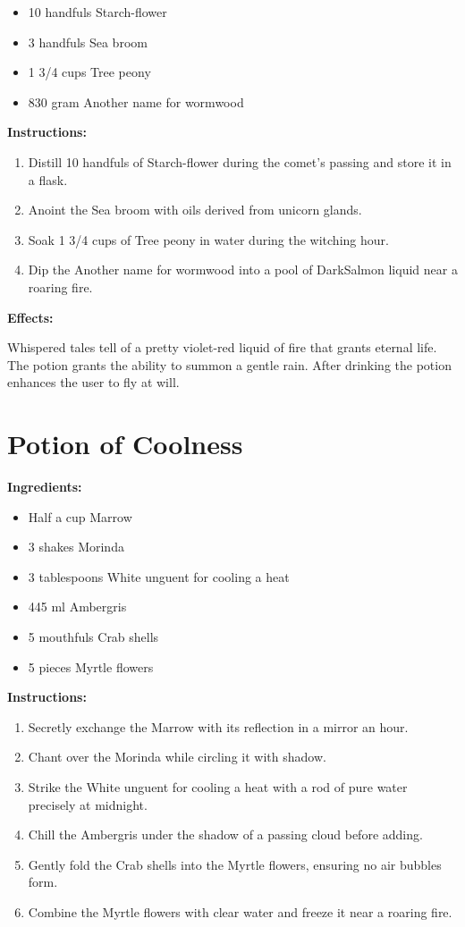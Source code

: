 \documentclass{article}
\begin{document}
\begin{itemize}
  \item 10 handfuls Starch-flower
  \item 3 handfuls Sea broom
  \item 1 3/4 cups Tree peony
  \item 830 gram Another name for wormwood
\end{itemize}

\textbf{Instructions:}

\begin{enumerate}
  \item Distill 10 handfuls of Starch-flower during the comet’s passing and store it in a flask.
  \item Anoint the Sea broom with oils derived from unicorn glands.
  \item Soak 1 3/4 cups of Tree peony in water during the witching hour.
  \item Dip the Another name for wormwood into a pool of DarkSalmon liquid near a roaring fire.
\end{enumerate}

\textbf{Effects:}

Whispered tales tell of a pretty violet-red liquid of fire that grants eternal life. The potion grants the ability to summon a gentle rain. After drinking the potion enhances the user to fly at will.

\newpage
\section*{Potion of Coolness}

\textbf{Ingredients:}

\begin{itemize}
  \item Half a cup Marrow
  \item 3 shakes Morinda
  \item 3 tablespoons White unguent for cooling a heat
  \item 445 ml Ambergris
  \item 5 mouthfuls Crab shells
  \item 5 pieces Myrtle flowers
\end{itemize}

\textbf{Instructions:}

\begin{enumerate}
  \item Secretly exchange the Marrow with its reflection in a mirror an hour.
  \item Chant over the Morinda while circling it with shadow.
  \item Strike the White unguent for cooling a heat with a rod of pure water precisely at midnight.
  \item Chill the Ambergris under the shadow of a passing cloud before adding.
  \item Gently fold the Crab shells into the Myrtle flowers, ensuring no air bubbles form.
  \item Combine the Myrtle flowers with clear water and freeze it near a roaring fire.
\end{enumerate}
\end{document}

